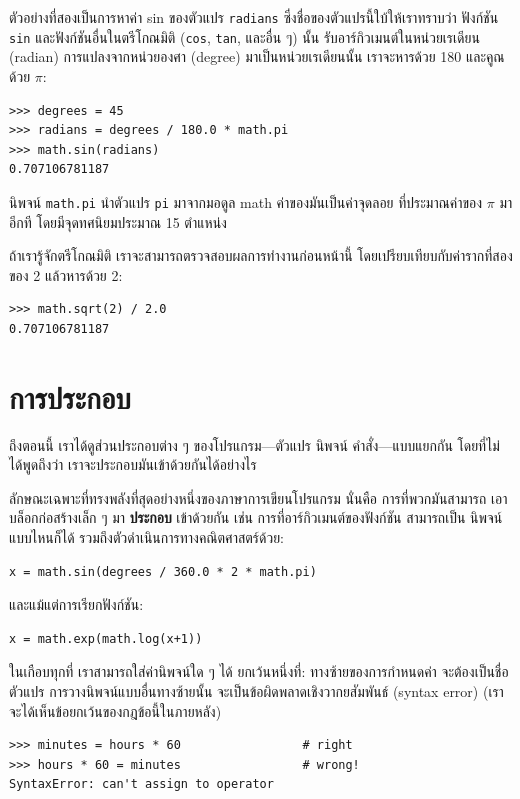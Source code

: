 ตัวอย่างที่สองเป็นการหาค่า sin ของตัวแปร {\tt radians} ซึ่งชื่อของตัวแปรนี้ใบ้ให้เราทราบว่า 
ฟังก์ชัน {\tt sin} และฟังก์ชันอื่นในตรีโกณมิติ ({\tt cos}, {\tt tan}, 
และอื่น ๆ) นั้น รับอาร์กิวเมนต์ในหน่วยเรเดียน (radian)  การแปลงจากหน่วยองศา (degree) 
มาเป็นหน่วยเรเดียนนั้น เราจะหารด้วย 180 และคูณด้วย $\pi$:

\begin{verbatim}
>>> degrees = 45
>>> radians = degrees / 180.0 * math.pi
>>> math.sin(radians)
0.707106781187
\end{verbatim}
%
นิพจน์ {\tt math.pi} นำตัวแปร {\tt pi} มาจากมอดูล math ค่าของมันเป็นค่าจุดลอย
ที่ประมาณค่าของ $\pi$ มาอีกที โดยมีจุดทศนิยมประมาณ 15 ตำแหน่ง

ถ้าเรารู้จักตรีโกณมิติ เราจะสามารถตรวจสอบผลการทำงานก่อนหน้านี้ โดยเปรียบเทียบกับค่ารากที่สองของ 2 
แล้วหารด้วย 2:

\begin{verbatim}
>>> math.sqrt(2) / 2.0
0.707106781187
\end{verbatim}
%


\section{การประกอบ} %

ถึงตอนนี้ เราได้ดูส่วนประกอบต่าง ๆ ของโปรแกรม---ตัวแปร นิพจน์ คำสั่ง---แบบแยกกัน 
โดยที่ไม่ได้พูดถึงว่า เราจะประกอบมันเข้าด้วยกันได้อย่างไร

ลักษณะเฉพาะที่ทรงพลังที่สุดอย่างหนึ่งของภาษาการเขียนโปรแกรม นั่นคือ การที่พวกมันสามารถ
เอาบล็อกก่อสร้างเล็ก ๆ มา {\bf ประกอบ} เข้าด้วยกัน เช่น การที่อาร์กิวเมนต์ของฟังก์ชัน สามารถเป็น
นิพจน์แบบไหนก็ได้ รวมถึงตัวดำเนินการทางคณิตศาสตร์ด้วย:

\begin{verbatim}
x = math.sin(degrees / 360.0 * 2 * math.pi)
\end{verbatim}
%
และแม้แต่การเรียกฟังก์ชัน:

\begin{verbatim}
x = math.exp(math.log(x+1))
\end{verbatim}
%
ในเกือบทุกที่ เราสามารถใส่ค่านิพจน์ใด ๆ ได้ ยกเว้นหนึ่งที่: ทางซ้ายของการกำหนดค่า
จะต้องเป็นชื่อตัวแปร การวางนิพจน์แบบอื่นทางซ้ายนั้น จะเป็นข้อผิดพลาดเชิงวากยสัมพันธ์ (syntax error) 
(เราจะได้เห็นข้อยกเว้นของกฎข้อนี้ในภายหลัง)

\begin{verbatim}
>>> minutes = hours * 60                 # right
>>> hours * 60 = minutes                 # wrong!
SyntaxError: can't assign to operator
\end{verbatim}
%


